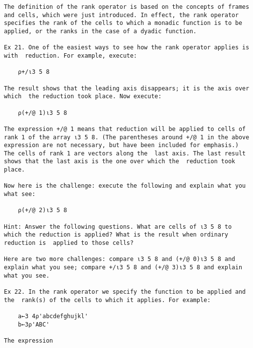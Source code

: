 \documentclass{article}
\begin{document}
\begin{verbatim}
The definition of the rank operator is based on the concepts of frames
and cells, which were just introduced. In effect, the rank operator   
specifies the rank of the cells to which a monadic function is to be  
applied, or the ranks in the case of a dyadic function.               

Ex 21. One of the easiest ways to see how the rank operator applies is
with  reduction. For example, execute:                                

	⍴+/⍳3 5 8                                                            

The result shows that the leading axis disappears; it is the axis over
which  the reduction took place. Now execute:                         

	⍴(+/@ 1)⍳3 5 8                                                       

The expression +/@ 1 means that reduction will be applied to cells of 
rank 1 of the array ⍳3 5 8. (The parentheses around +/@ 1 in the above
expression are not necessary, but have been included for emphasis.)   
The cells of rank 1 are vectors along the  last axis. The last result 
shows that the last axis is the one over which the  reduction took    
place.                                                                

Now here is the challenge: execute the following and explain what you 
what see:                                                             

	⍴(+/@ 2)⍳3 5 8                                                       

Hint: Answer the following questions. What are cells of ⍳3 5 8 to     
which the reduction is applied? What is the result when ordinary      
reduction is  applied to those cells?                                 

Here are two more challenges: compare ⍳3 5 8 and (+/@ 0)⍳3 5 8 and    
explain what you see; compare +/⍳3 5 8 and (+/@ 3)⍳3 5 8 and explain  
what you see.                                                         

Ex 22. In the rank operator we specify the function to be applied and 
the  rank(s) of the cells to which it applies. For example:           

	a←3 4⍴'abcdefghujkl'                                                 
	b←3⍴'ABC' 	                                                          

The expression                                                        


\end{verbatim}
\end{document}
